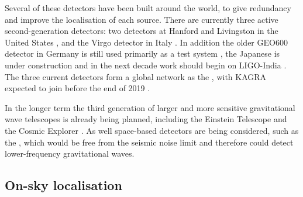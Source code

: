 \begin{colsection}
\begin{colsection}
Several of these detectors have been built around the world, to give redundancy and improve the localisation of each source. There are currently three active second-generation detectors: two  detectors at Hanford and Livingston in the United States \citep{LIGO}, and the  Virgo detector in Italy \citep{Virgo}. In addition the older GEO600 detector in Germany is still used primarily as a test system \citep{GEO600}, the Japanese  is under construction \citep{KAGRA} and in the next decade work should begin on LIGO-India \citep{LIGO_India}. The three current detectors form a global network as the , with KAGRA expected to join before the end of 2019 \citep{LIGO-Virgo, LIGO-Virgo-KAGRA}.

In the longer term the third generation of larger and more sensitive gravitational wave telescopes is already being planned, including the Einstein Telescope \citep{EinsteinTelescope} and the Cosmic Explorer \citep{CosmicExplorer}. As well space-based detectors are being considered, such as the  \citep{LISA}, which would be free from the seismic noise limit and therefore could detect lower-frequency gravitational waves.

\newpage

\end{colsection}

\newpage
\subsection{On-sky localisation}
\label{sec:gw_localisation}
\begin{colsection}


\end{colsection}
\end{colsection}
